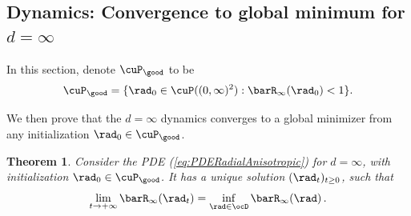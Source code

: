 \documentclass[11pt]{article}
\newtheorem{theorem}{Theorem}
\begin{document}
\subsection{Dynamics: Convergence to global minimum for $d=\infty$}

In this section, denote $\cuP_{\good}$ to be 
\begin{align}\label{eqn:goodset_anisotropic_infty_2d}
\cuP_{\good} = \{\rad_0 \in \cuP((0, \infty)^2): \barR_\infty(\rad_0) < 1 \}.
\end{align}

We then prove that the $d=\infty$ dynamics converges to a global minimizer from any initialization $\rad_0 \in \cuP_{\good}$.



\begin{theorem}\label{thm:PDE_converge_to_global_minimizer_anisotropic}
Consider the PDE (\ref{eq:PDERadialAnisotropic}) for $d=\infty$, with initialization $\rad_0\in\cuP_{\good}$. It has a unique solution $(\rad_t)_{t \ge 0}$, such that
\[
\lim_{t\rightarrow +\infty} \barR_\infty(\rad_t) = \inf_{\rad \in \ocD} \barR_\infty(\rad)\, .
\]
\end{theorem}
\end{document}
